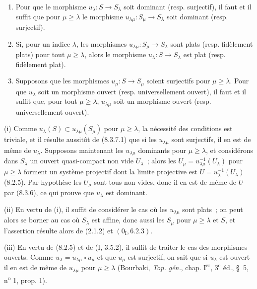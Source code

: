 \begin{proposition}[8.3.8]
\label{IV.8.3.8-fr}
\begin{enumerate}
\item[(i)] Pour que le morphisme $u_\lambda:S\to S_\lambda$ soit dominant
(resp. surjectif), il faut et il suffit que pour $\mu\geq\lambda$ le
morphisme $u_{\lambda\mu}:S_\mu\to S_\lambda$ soit dominant (resp.
surjectif).
\item[(ii)] Si, pour un indice $\lambda$, les morphismes
$u_{\lambda\mu}:S_\mu\to S_\lambda$ sont plats (resp. fidèlement plats)
pour tout $\mu\geq\lambda$, alors le morphisme
$u_\lambda:S\to S_\lambda$ est plat (resp. fidèlement plat).
\item[(iii)] Supposons que les morphismes $u_\mu:S\to S_\mu$ soient
surjectifs pour $\mu\geq\lambda$. Pour que $u_\lambda$ soit un morphisme
ouvert (resp. universellement ouvert), il faut et il suffit que, pour tout
$\mu\geq\lambda$, $u_{\lambda\mu}$ soit un morphisme ouvert (resp.
universellement ouvert).
\end{enumerate}
\end{proposition}

\noindent
(i) Comme $u_\lambda(S)\subset u_{\lambda\mu}(S_\mu)$ pour
$\mu\geq\lambda$, la nécessité des conditions est triviale, et il résulte
aussitôt de (8.3.7.1) que si les $u_{\lambda\mu}$ sont surjectifs, il en est
de même de $u_\lambda$. Supposons maintenant les $u_{\lambda\mu}$ dominants
pour $\mu\geq\lambda$, et considérons dans $S_\lambda$ un ouvert
quasi-compact non vide $U_\lambda$~; alors les
$U_\mu=u_{\lambda\mu}^{-1}(U_\lambda)$ pour $\mu\geq\lambda$ forment un
système projectif dont la limite projective est
$U=u_\lambda^{-1}(U_\lambda)$ (8.2.5). Par hypothèse les $U_\mu$ sont tous
non vides, donc il en est de même de $U$ par (8.3.6), ce qui prouve que
$u_\lambda$ est dominant.

\medskip
\noindent
(ii) En vertu de (i), il suffit de considérer le cas où les
$u_{\lambda\mu}$ sont plats~; on peut alors se borner au cas où $S_\lambda$
est affine, donc aussi les $S_\mu$ pour $\mu\geq\lambda$ et $S$, et
l'assertion résulte alors de (2.1.2) et $(0_{\mathrm I},6.2.3)$.

\medskip
\noindent
(iii) En vertu de (8.2.5) et de (I, 3.5.2), il suffit de traiter le cas des
morphismes ouverts. Comme $u_\lambda=u_{\lambda\mu}\circ u_\mu$ et que
$u_\mu$ est surjectif, on sait que si $u_\lambda$ est ouvert il en est de
même de $u_{\lambda\mu}$ pour $\mu\geq\lambda$ (Bourbaki,
\emph{Top. gén.}, chap. $\mathrm I^{\mathrm{er}}$, $3^{\mathrm e}$ éd.,
\S~5, n\textsuperscript{o} 1, prop. 1).


